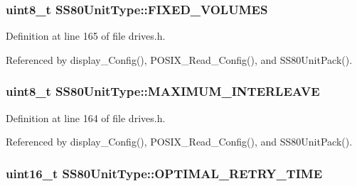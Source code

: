 \subsubsection[{\texorpdfstring{F\+I\+X\+E\+D\+\_\+\+V\+O\+L\+U\+M\+ES}{FIXED_VOLUMES}}]{\setlength{\rightskip}{0pt plus 5cm}uint8\+\_\+t S\+S80\+Unit\+Type\+::\+F\+I\+X\+E\+D\+\_\+\+V\+O\+L\+U\+M\+ES}\hypertarget{structSS80UnitType_ae1d52bfc5a9bdb8f6f26ba6dffd7c2f6}{}\label{structSS80UnitType_ae1d52bfc5a9bdb8f6f26ba6dffd7c2f6}


Definition at line 165 of file drives.\+h.



Referenced by display\+\_\+\+Config(), P\+O\+S\+I\+X\+\_\+\+Read\+\_\+\+Config(), and S\+S80\+Unit\+Pack().

\subsubsection[{\texorpdfstring{M\+A\+X\+I\+M\+U\+M\+\_\+\+I\+N\+T\+E\+R\+L\+E\+A\+VE}{MAXIMUM_INTERLEAVE}}]{\setlength{\rightskip}{0pt plus 5cm}uint8\+\_\+t S\+S80\+Unit\+Type\+::\+M\+A\+X\+I\+M\+U\+M\+\_\+\+I\+N\+T\+E\+R\+L\+E\+A\+VE}\hypertarget{structSS80UnitType_ab215c7a9a84d0d5003a2dcfbd18e4b7d}{}\label{structSS80UnitType_ab215c7a9a84d0d5003a2dcfbd18e4b7d}


Definition at line 164 of file drives.\+h.



Referenced by display\+\_\+\+Config(), P\+O\+S\+I\+X\+\_\+\+Read\+\_\+\+Config(), and S\+S80\+Unit\+Pack().

\subsubsection[{\texorpdfstring{O\+P\+T\+I\+M\+A\+L\+\_\+\+R\+E\+T\+R\+Y\+\_\+\+T\+I\+ME}{OPTIMAL_RETRY_TIME}}]{\setlength{\rightskip}{0pt plus 5cm}uint16\+\_\+t S\+S80\+Unit\+Type\+::\+O\+P\+T\+I\+M\+A\+L\+\_\+\+R\+E\+T\+R\+Y\+\_\+\+T\+I\+ME}\hypertarget{structSS80UnitType_ab7ae848f0a65aa2e29b613bc110c9085}{}\label{structSS80UnitType_ab7ae848f0a65aa2e29b613bc110c9085}


